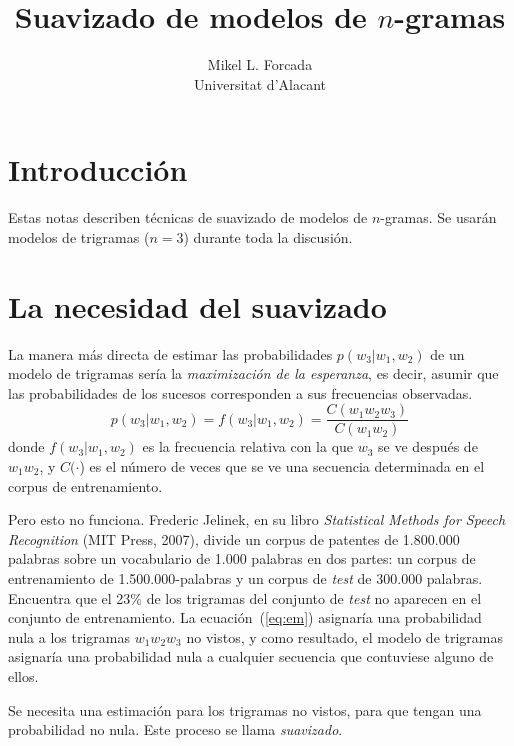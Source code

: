 \documentclass[12pt,a4paper]{article} \usepackage[spanish]{babel}
\begin{document}
\title{Suavizado de modelos de \(n\)-gramas}
\author{Mikel L. Forcada \\
Universitat d'Alacant \\}
\maketitle

\section{Introducción}
Estas notas describen técnicas de suavizado de modelos de \(n\)-gramas. Se usarán modelos de trigramas  (\(n=3\))
durante toda la discusión.

\section{La necesidad del suavizado}

La manera más directa de estimar las probabilidades \(p(w_3|w_1,w_2)\) de un modelo de trigramas sería la \emph{maximización de la esperanza}, es decir, asumir que las probabilidades de los sucesos corresponden a sus frecuencias observadas.
\begin{equation}
  \label{eq:em}
  p(w_3|w_1,w_2)=f(w_3|w_1,w_2)=\frac{C(w_1w_2w_3)}{C(w_1w_2)}
\end{equation}
donde \(f(w_3|w_1,w_2)\) es la frecuencia relativa con la que \(w_3\) se ve después de  \(w_1w_2\), y \(C(\cdot\)) es el número de veces que se ve una secuencia determinada en el corpus de entrenamiento.

Pero esto no funciona. Frederic Jelinek, en su libro \emph{Statistical
  Methods for Speech Recognition} (MIT Press, 2007), divide un corpus de patentes de  1.800.000 palabras sobre un vocabulario de 1.000  palabras en dos partes:
un corpus de entrenamiento de 1.500.000-palabras y un corpus de \emph{test} de 300.000 palabras. Encuentra que el 23\% de los trigramas del conjunto de \emph{test} no aparecen en el conjunto de entrenamiento. La ecuación~(\ref{eq:em}) asignaría una probabilidad nula a los trigramas \(w_1w_2w_3\) no vistos, y como resultado, el modelo de trigramas asignaría una probabilidad nula a cualquier secuencia que contuviese alguno de ellos.

Se necesita una estimación para los trigramas no vistos, para que tengan una probabilidad no nula. Este proceso se llama \emph{suavizado}.
\end{document}
